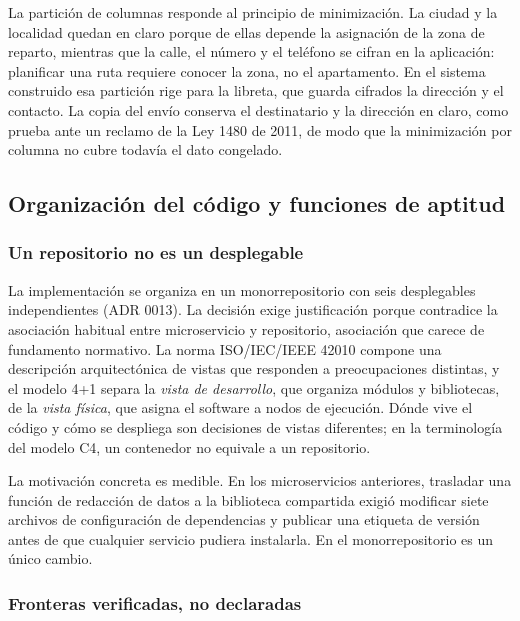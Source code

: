 La partición de columnas responde al principio de minimización. La ciudad y la localidad
quedan en claro porque de ellas depende la asignación de la zona de reparto, mientras que
la calle, el número y el teléfono se cifran en la aplicación: planificar una ruta requiere
conocer la zona, no el apartamento. En el sistema construido esa partición rige para la
libreta, que guarda cifrados la dirección y el contacto. La copia del envío conserva el
destinatario y la dirección en claro, como prueba ante un reclamo de la Ley 1480 de 2011, de
modo que la minimización por columna no cubre todavía el dato congelado.

\subsection{Organización del código y funciones de aptitud}
\label{sec:monorepo}

\subsubsection{Un repositorio no es un desplegable}

La implementación se organiza en un monorrepositorio con seis desplegables independientes
(ADR 0013). La decisión exige justificación porque contradice la asociación habitual entre
microservicio y repositorio, asociación que carece de fundamento normativo. La norma
ISO/IEC/IEEE 42010 \citep{iso_42010_2022} compone una descripción arquitectónica de vistas
que responden a preocupaciones distintas, y el modelo 4+1 \citep{kruchten_41_1995} separa
la \emph{vista de desarrollo}, que organiza módulos y bibliotecas, de la \emph{vista
física}, que asigna el software a nodos de ejecución. Dónde vive el código y cómo se
despliega son decisiones de vistas diferentes; en la terminología del modelo C4, un
contenedor no equivale a un repositorio.

La motivación concreta es medible. En los microservicios anteriores, trasladar una función
de redacción de datos a la biblioteca compartida exigió modificar siete archivos de
configuración de dependencias y publicar una etiqueta de versión antes de que cualquier
servicio pudiera instalarla. En el monorrepositorio es un único cambio.

\subsubsection{Fronteras verificadas, no declaradas}

